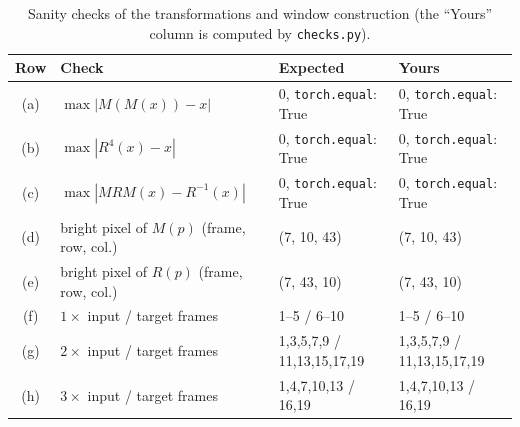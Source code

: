 \begin{table}[htbp]
\centering
\small
\caption{Sanity checks of the transformations and window construction (the ``Yours'' column is computed by \texttt{checks.py}).}
\label{tab:1}
\begin{tabular}{cp{5.5cm}ll}
\toprule
Row & Check & Expected & Yours \\
\midrule
(a) & $\max|M(M(x))-x|$ & 0, \texttt{torch.equal}: True & 0, \texttt{torch.equal}: True \\
(b) & $\max|R^4(x)-x|$ & 0, \texttt{torch.equal}: True & 0, \texttt{torch.equal}: True \\
(c) & $\max|MRM(x)-R^{-1}(x)|$ & 0, \texttt{torch.equal}: True & 0, \texttt{torch.equal}: True \\
(d) & bright pixel of $M(p)$ (frame, row, col.) & (7, 10, 43) & (7, 10, 43) \\
(e) & bright pixel of $R(p)$ (frame, row, col.) & (7, 43, 10) & (7, 43, 10) \\
\midrule
(f) & $1\times$ input / target frames & 1--5 / 6--10 & 1--5 / 6--10 \\
(g) & $2\times$ input / target frames & 1,3,5,7,9 / 11,13,15,17,19 & 1,3,5,7,9 / 11,13,15,17,19 \\
(h) & $3\times$ input / target frames & 1,4,7,10,13 / 16,19 & 1,4,7,10,13 / 16,19 \\
\bottomrule
\end{tabular}
\end{table}
